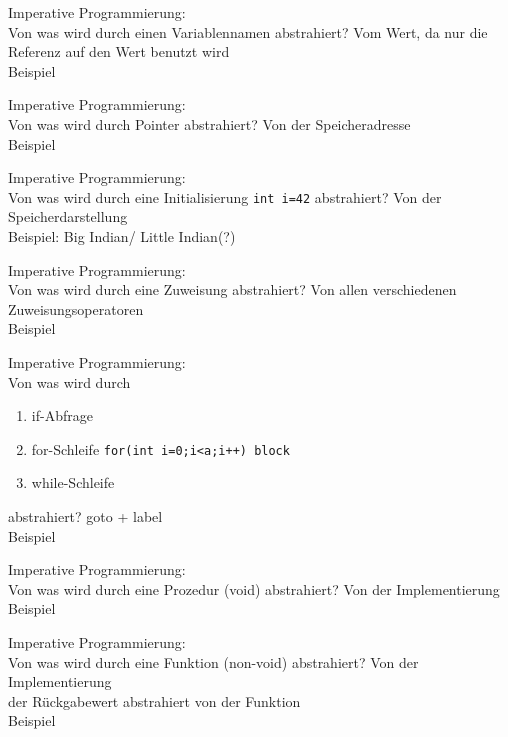 \begin{card}
	Imperative Programmierung:\\
	Von was wird durch einen Variablennamen abstrahiert?
	\hr
	Vom Wert, da nur die Referenz auf den Wert benutzt wird\\
	Beispiel
\end{card}

\begin{card}
	Imperative Programmierung:\\
	Von was wird durch Pointer abstrahiert?
	\hr
	Von der Speicheradresse\\
	Beispiel
\end{card}

\begin{card}
	Imperative Programmierung:\\
	Von was wird durch eine Initialisierung \texttt{int i=42} abstrahiert?
	\hr
	Von der Speicherdarstellung	\\
	Beispiel: Big Indian/ Little Indian(?)
\end{card}

\begin{card}
	Imperative Programmierung:\\
	Von was wird durch eine Zuweisung abstrahiert?
	\hr
	Von allen verschiedenen Zuweisungsoperatoren\\
	Beispiel
\end{card}

\begin{card}
	Imperative Programmierung:\\
	Von was wird durch 
	\begin{enumerate}
	\item if-Abfrage
	\item for-Schleife \texttt{for(int i=0;i<a;i++) block} 
	\item while-Schleife
	\end{enumerate}
	abstrahiert?
	\hr
	goto + label\\
	Beispiel
\end{card}

\begin{card}
	Imperative Programmierung:\\
	Von was wird durch eine Prozedur (void) abstrahiert?
	\hr
	Von der Implementierung\\
	Beispiel
\end{card}

\begin{card}
	Imperative Programmierung:\\
	Von was wird durch eine Funktion (non-void) abstrahiert?
	\hr
	Von der Implementierung\\
	der Rückgabewert abstrahiert von der Funktion\\
	Beispiel
\end{card}


